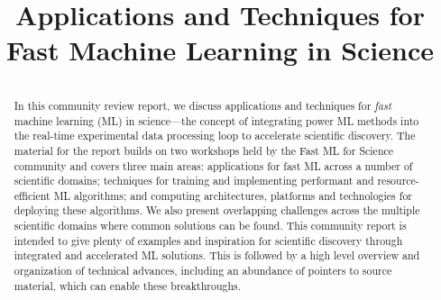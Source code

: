 \documentclass[utf8]{frontiersFPHY}
\begin{document}
\title[Fast Machine Learning in Science]{Applications and Techniques for Fast Machine Learning in Science}

\onecolumn

\author[\firstAuthorLast ]{\Authors} %
\address{} %
\correspondance{} %


\maketitle


\clearpage
\begin{abstract}
\section{}
In this community review report, we discuss applications and techniques for \textit{fast} machine learning (ML) in science---the concept of integrating power ML methods into the real-time experimental data processing loop to accelerate scientific discovery. 
The material for the report builds on two workshops held by the Fast ML for Science community and covers three main areas: applications for fast ML across a number of scientific domains; techniques for training and implementing performant and resource-efficient ML algorithms; and computing architectures, platforms and technologies for deploying these algorithms.  
We also present overlapping challenges across the multiple scientific domains where common solutions can be found.  This community report is intended to give plenty of examples and inspiration for scientific discovery through integrated and accelerated ML solutions.  
This is followed by a high level overview and organization of technical advances, including an abundance of pointers to source material, which can enable these breakthroughs.  
\tiny
\end{abstract}
\end{document}
